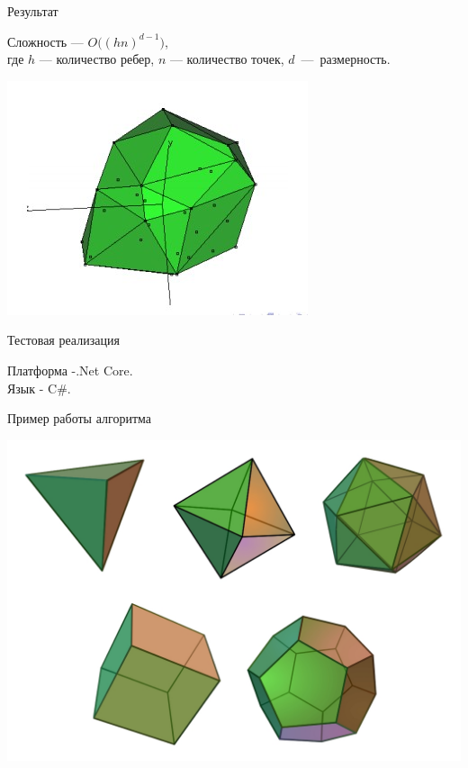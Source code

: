\documentclass{beamer}
\begin{document}
\begin{frame}{Результат}

    Сложность --- $O\big((hn)^{d-1}\big)$,\\
    где $h$ --- количество ребер, $n$ --- количество точек, $d$~---~размерность.
    \vfill
    \begin{center}
        \includegraphics[width=0.6\linewidth]{simplex.jpg}%
    \end{center}


\end{frame}


\begin{frame}{Тестовая реализация}

Платформа -.Net Core. \\
Язык - C\#.

\end{frame}

\begin{frame}{Пример работы алгоритма}
    \begin{center}
        \includegraphics[width=\linewidth]{regular.jpg}
    \end{center}
\end{frame}

\end{document}

